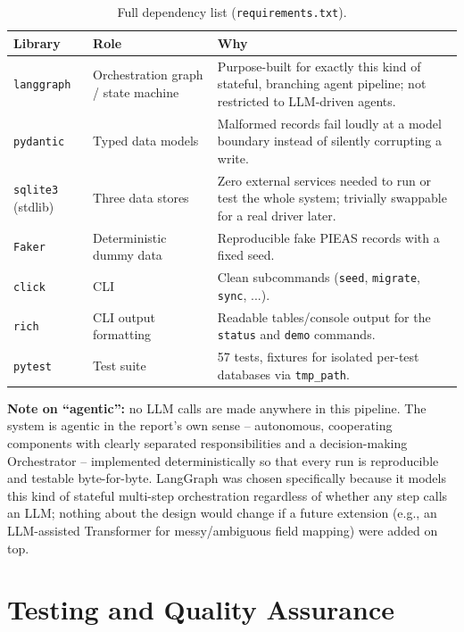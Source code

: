 \documentclass[11pt,a4paper]{article}
\begin{document}
\begin{table}[H]
\centering
\small
\begin{tabular}{@{}p{2.1cm}p{3.3cm}p{7.6cm}@{}}
\toprule
\textbf{Library} & \textbf{Role} & \textbf{Why} \\
\midrule
\texttt{langgraph} & Orchestration graph / state machine & Purpose-built for exactly this kind
of stateful, branching agent pipeline; not restricted to LLM-driven agents. \\
\texttt{pydantic} & Typed data models & Malformed records fail loudly at a model boundary
instead of silently corrupting a write. \\
\texttt{sqlite3} (stdlib) & Three data stores & Zero external services needed to run or test the
whole system; trivially swappable for a real driver later. \\
\texttt{Faker} & Deterministic dummy data & Reproducible fake PIEAS records with a fixed seed. \\
\texttt{click} & CLI & Clean subcommands (\texttt{seed}, \texttt{migrate}, \texttt{sync}, ...). \\
\texttt{rich} & CLI output formatting & Readable tables/console output for the \texttt{status}
and \texttt{demo} commands. \\
\texttt{pytest} & Test suite & 57 tests, fixtures for isolated per-test databases via
\texttt{tmp\_path}. \\
\bottomrule
\end{tabular}
\caption{Full dependency list (\texttt{requirements.txt}).}
\end{table}

\textbf{Note on ``agentic'':} no LLM calls are made anywhere in this pipeline. The system is
agentic in the report's own sense -- autonomous, cooperating components with clearly separated
responsibilities and a decision-making Orchestrator -- implemented deterministically so that
every run is reproducible and testable byte-for-byte. LangGraph was chosen specifically because
it models this kind of stateful multi-step orchestration regardless of whether any step calls
an LLM; nothing about the design would change if a future extension (e.g., an LLM-assisted
Transformer for messy/ambiguous field mapping) were added on top.

\section{Testing and Quality Assurance}
\label{sec:testing}
\end{document}
